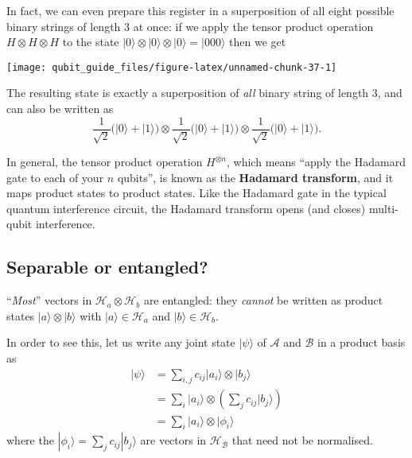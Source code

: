 \documentclass[fleqn]{article}
\newenvironment{idea}{\noindent}{\medskip}
\begin{document}
In fact, we can even prepare this register in a superposition of all eight possible binary strings of length \(3\) at once: if we apply the tensor product operation \(H\otimes H\otimes H\) to the state \(|0\rangle\otimes|0\rangle\otimes|0\rangle = |000\rangle\) then we get

\begin{center}\texttt{[image: qubit\_guide\_files/figure-latex/unnamed-chunk-37-1]} \end{center}

The resulting state is exactly a superposition of \emph{all} binary string of length \(3\), and can also be written as
\[
  \frac{1}{\sqrt{2}} \big(|0\rangle + |1\rangle\big)
  \otimes
  \frac{1}{\sqrt{2}} \big(|0\rangle + |1\rangle\big)
  \otimes
  \frac{1}{\sqrt{2}} \big(|0\rangle + |1\rangle\big).
\]

In general, the tensor product operation \(H^{\otimes n}\), which means ``apply the Hadamard gate to each of your \(n\) qubits'', is known as the \textbf{Hadamard transform}, and it maps product states to product states.
Like the Hadamard gate in the typical quantum interference circuit, the Hadamard transform opens (and closes) multi-qubit interference.

\hypertarget{separable-or-entangled}{%
\subsection{Separable or entangled?}\label{separable-or-entangled}}

\begin{idea}
``\emph{Most}'' vectors in \(\mathcal{H}_a\otimes \mathcal{H}_b\) are entangled: they \emph{cannot} be written as product states \(|a\rangle\otimes|b\rangle\) with \(|a\rangle\in\mathcal{H}_a\) and \(|b\rangle\in\mathcal{H}_b\).

\end{idea}

In order to see this, let us write any joint state \(|\psi\rangle\) of \(\mathcal{A}\) and \(\mathcal{B}\) in a product basis as
\[
  \begin{aligned}
    |\psi\rangle
    &= \sum_{i,j} c_{ij}|a_i\rangle\otimes|b_j\rangle
  \\&= \sum_i|a_i\rangle\otimes\left(\sum_j c_{ij}|b_j\rangle\right)
  \\&= \sum_i|a_i\rangle\otimes|\phi_i\rangle
  \end{aligned}
\tag{$\ddagger$}
\]
where the \(|\phi_i\rangle=\sum_j c_{ij}|b_j\rangle\) are vectors in \(\mathcal{H}_{\mathcal{B}}\) that need not be normalised.
\end{document}
